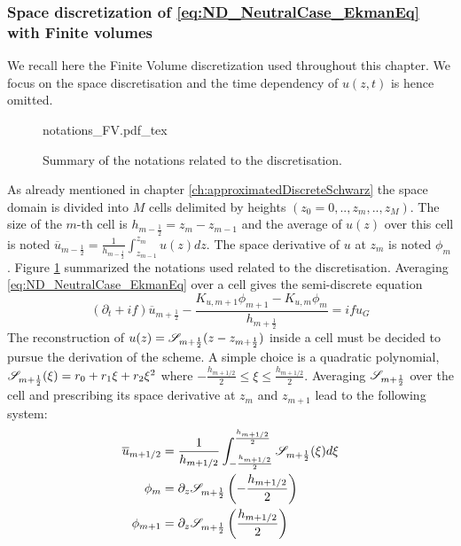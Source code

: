 \subsubsection{Space discretization of
\eqref{eq:ND_NeutralCase_EkmanEq} with Finite volumes}
\label{sec:ND_NeutralCase_recallSplines}
We recall here the Finite Volume discretization used throughout
this chapter. We focus on the space discretisation and the time
dependency of $u(z, t)$ is hence omitted.
\begin{figure}
	\centering
	{notations_FV.pdf_tex}
	\caption{Summary of the notations related to the discretisation.}
	\label{fig:ND_NeutralCase_summary_notations}
\end{figure}
\par
As already mentioned in chapter \ref{ch:approximatedDiscreteSchwarz}
the space domain is divided into $M$ cells delimited by
heights $(z_0=0, .., z_m, .., z_M)$. The size of the $m$-th cell
is $h_{m-\frac{1}{2}}=z_{m}-z_{m-1}$ and the average of $u(z)$
over this cell is noted
$\overline{u}_{m-\frac{1}{2}}=\frac{1} {h_{m-\frac{1}{2}}}
\int_{z_{m-1}}^{z_m}u(z)dz$.
The space derivative of $u$ at $z_m$ is noted $\phi_{m}$.
Figure \ref{fig:ND_NeutralCase_summary_notations} summarized
the notations used related to the discretisation.
Averaging \eqref{eq:ND_NeutralCase_EkmanEq} over a cell gives
the semi-discrete equation
\begin{equation}
\label{eq:ND_NeutralCase_semiDiscreteEkmanEq}
	(\partial_t + if) \overline{u}_{m+\frac{1}{2}} - 
	\frac{K_{u, m+1} \phi_{m+1} - K_{u, m} \phi_{m}}
		{h_{m+\frac{1}{2}}} = i f u_G
\end{equation}
The reconstruction of $u(z) = {\cal S}_{m+\frac{1}{2}}
				(z - z_{m+\frac{1}{2}})$
				inside a cell must be decided
to pursue the derivation of the scheme. A simple choice is
a quadratic polynomial,
${\cal S}_{m+\frac{1}{2}}(\xi) = r_0 + r_1 \xi + r_2 \xi^2$ where
$-\frac{h_{m+1/2}}{2} \leq \xi \leq \frac{h_{m+1/2}}{2}$.
Averaging ${\cal S}_{m+\frac{1}{2}}$ over the cell and
prescribing its space derivative at $z_{m}$ and $z_{m+1}$
lead to the following system:
\begin{equation}
	\begin{aligned}
		\overline{u}_{m+1/2} &= \frac{1}{h_{m+1/2}}
		\int_{-\frac{h_{m+1/2}}{2}}^{\frac{h_{m+1/2}}{2}}
		{\cal S}_{m+\frac{1}{2}}(\xi)d\xi\\
		\phi_m &= \partial_z {\cal S}_{m+\frac{1}{2}}
		\left(-\frac{h_{m+1/2}}{2}\right)\\
		\phi_{m+1} &=
		\partial_z {\cal S}_{m+\frac{1}{2}}
		\left(\frac{h_{m+1/2}}{2}\right)
	\end{aligned}
\end{equation}
